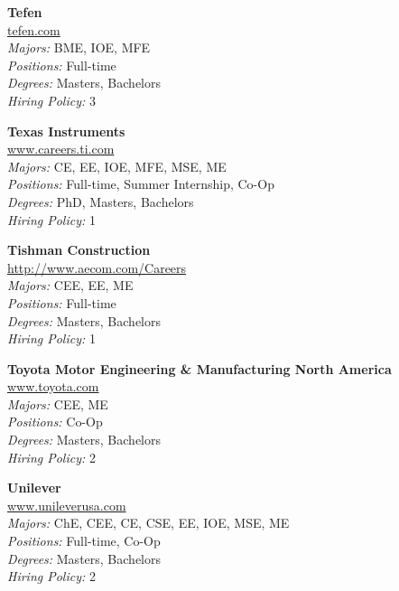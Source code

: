 \documentclass{article}
\begin{document}
\begin{center}
\begin{multicols}{3}
\begin{minipage}{.9\columnwidth}{\Large\bf Tefen }\\
	\url{tefen.com}\\
	\emph{Majors:} BME, IOE, MFE\\
	\emph{Positions:} Full-time\\
	\emph{Degrees:} Masters, Bachelors\\
	\emph{Hiring Policy:} 3\\
\end{minipage}
 
\begin{minipage}{.9\columnwidth}{\Large\bf Texas Instruments }\\
	\url{www.careers.ti.com}\\
	\emph{Majors:} CE, EE, IOE, MFE, MSE, ME\\
	\emph{Positions:} Full-time, Summer Internship, Co-Op\\
	\emph{Degrees:} PhD, Masters, Bachelors\\
	\emph{Hiring Policy:} 1\\
\end{minipage}
 
\begin{minipage}{.9\columnwidth}{\Large\bf Tishman Construction }\\
	\url{http://www.aecom.com/Careers}\\
	\emph{Majors:} CEE, EE, ME\\
	\emph{Positions:} Full-time\\
	\emph{Degrees:} Masters, Bachelors\\
	\emph{Hiring Policy:} 1\\
\end{minipage}
 
\begin{minipage}{.9\columnwidth}{\Large\bf Toyota Motor Engineering \& Manufacturing North America }\\
	\url{www.toyota.com}\\
	\emph{Majors:} CEE, ME\\
	\emph{Positions:} Co-Op\\
	\emph{Degrees:} Masters, Bachelors\\
	\emph{Hiring Policy:} 2\\
\end{minipage}
 
\begin{minipage}{.9\columnwidth}{\Large\bf Unilever }\\
	\url{www.unileverusa.com}\\
	\emph{Majors:} ChE, CEE, CE, CSE, EE, IOE, MSE, ME\\
	\emph{Positions:} Full-time, Co-Op\\
	\emph{Degrees:} Masters, Bachelors\\
	\emph{Hiring Policy:} 2\\
\end{minipage}
 

\end{multicols}
\end{center}
\end{document}
